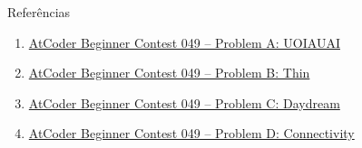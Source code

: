 \begin{frame}[fragile]{Referências}

    \begin{enumerate}
        \item \href{https://atcoder.jp/contests/abc046/tasks/abc049_a}{AtCoder Beginner Contest 
            049 -- Problem A: UOIAUAI}

        \item \href{https://atcoder.jp/contests/abc046/tasks/abc049_b}{AtCoder Beginner Contest 
            049 -- Problem B: Thin}

        \item \href{https://atcoder.jp/contests/abc046/tasks/arc065_a}{AtCoder Beginner Contest
            049 -- Problem C: Daydream}

        \item \href{https://atcoder.jp/contests/abc046/tasks/arc065_b}{AtCoder Beginner Contest
            049 -- Problem D: Connectivity}
    \end{enumerate}

\end{frame}
